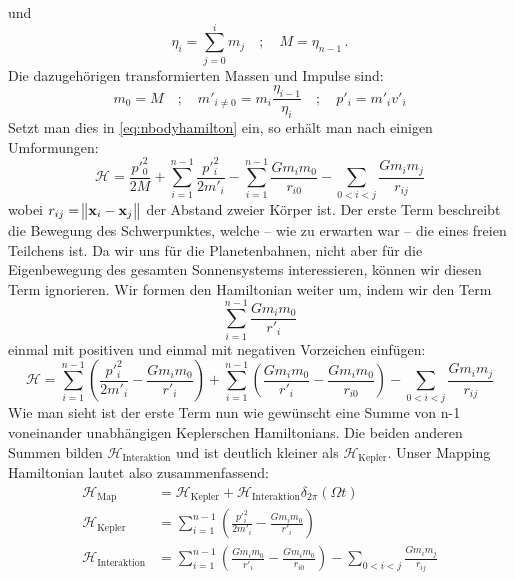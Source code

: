 \documentclass[12pt,a4paper,twoside]{article}
\renewcommand{\vec}{\mathbf}
\renewcommand{\H}{\mathcal H}
\begin{document}
und
\begin{equation}
\eta_i = \sum\limits_{j=0}^{i} m_j \quad ; \quad M = \eta_{n-1}\,.
\end{equation}
Die dazugehörigen transformierten Massen und Impulse sind:
\begin{equation}
m_0 = M \quad ; \quad m'_{i\neq 0} = m_i \frac{\eta_{i-1}}{\eta_{i}} \quad ; \quad p'_i = m'_i v'_i
\end{equation}
Setzt man dies in \ref{eq:nbodyhamilton} ein, so erhält man nach einigen Umformungen: %
\begin{equation}
\H = \frac{p'^2_0}{2M} + \sum\limits_{i=1}^{n-1} \frac{p'^2_i}{2m'_i} - \sum\limits_{i=1}^{n-1} \frac{Gm_im_0}{r_{i0}} - \sum\limits_{0<i<j} \frac{Gm_im_j}{r_{ij}}
\end{equation}
wobei $r_{ij}=\norm{\vec{x}_i-\vec{x}_j}$ der Abstand zweier Körper ist. Der erste Term beschreibt die Bewegung des Schwerpunktes, welche – wie zu erwarten war – die eines freien Teilchens ist. Da wir uns für die Planetenbahnen, nicht aber für die Eigenbewegung des gesamten Sonnensystems interessieren, können wir diesen Term ignorieren.
Wir formen den Hamiltonian weiter um, indem wir den Term
\begin{equation}
\sum\limits_{i=1}^{n-1} \frac{Gm_im_0}{r'_i}
\end{equation}
einmal mit positiven und einmal mit negativen Vorzeichen einfügen:
\begin{equation}
\H = \sum\limits_{i=1}^{n-1} \left( \frac{p'^2_i}{2m'_i} - \frac{Gm_im_0}{r'_i} \right)
  +  \sum\limits_{i=1}^{n-1} \left( \frac{Gm_im_0}{r'_i} - \frac{Gm_im_0}{r_{i0}} \right)
  -  \sum\limits_{0<i<j} \frac{Gm_im_j}{r_{ij}}
\end{equation}
Wie man sieht ist der erste Term nun wie gewünscht eine Summe von n-1 voneinander unabhängigen Keplerschen Hamiltonians. Die beiden anderen Summen bilden $\H_{\mathrm{Interaktion}}$ und ist deutlich kleiner als $\H_{\mathrm{Kepler}}$. Unser Mapping Hamiltonian lautet also zusammenfassend:
\begin{align}
\H_{\mathrm{Map}} &= \H_{\mathrm{Kepler}} + \H_{\mathrm{Interaktion}}\delta_{2\pi}(\Omega t) \\
\H_{\mathrm{Kepler}} &= \sum\limits_{i=1}^{n-1} \left( \frac{p'^2_i}{2m'_i} - \frac{Gm_im_0}{r'_i} \right) \\
\H_{\mathrm{Interaktion}} &= \sum\limits_{i=1}^{n-1} \left( \frac{Gm_im_0}{r'_i} - \frac{Gm_im_0}{r_{i0}} \right)
  -  \sum\limits_{0<i<j} \frac{Gm_im_j}{r_{ij}}
\end{align} %
\end{document}
